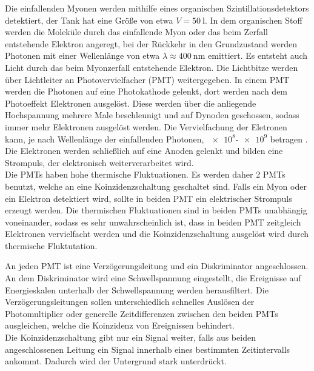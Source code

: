 \noindent Die einfallenden Myonen werden mithilfe eines organischen Szintillationsdetektors detektiert, der Tank hat eine Größe von etwa $V = \SI{50}{\litre}$. 
In dem organischen Stoff werden die Moleküle durch das einfallende Myon oder das beim Zerfall entstehende Elektron angeregt, 
bei der Rückkehr in den Grundzustand werden Photonen mit einer Wellenlänge von etwa $\lambda \approx \SI{400}{\nano\metre}$ \cite{kalonoski} emittiert. Es entsteht 
auch Licht durch das beim Myonzerfall entstehende Elektron. Die Lichtbitze werden über Lichtleiter an Photovervielfacher (PMT) weitergegeben. In einem PMT werden die Photonen auf eine 
Photokathode gelenkt, dort werden nach dem Photoeffekt Elektronen ausgelöst. Diese werden über die anliegende Hochspannung mehrere Male beschleunigt und auf Dynoden geschossen, sodass 
immer mehr Elektronen ausgelöst werden. Die Vervielfachung der Eletronen kann, je nach Wellenlänge der einfallenden Photonen, $\num{e8}$-$\num{e9}$ betragen \cite{kalonoski}.
Die Elektronen werden schließlich auf eine Anoden gelenkt und bilden eine Strompuls, der elektronisch weiterverarbeitet wird. \\
Die PMTs haben hohe thermische Fluktuationen. Es werden daher 2 PMTs benutzt, welche an eine Koinzidenzschaltung geschaltet sind. Falls ein Myon oder ein Elektron detektiert wird, sollte 
in beiden PMT ein elektrischer Strompuls erzeugt werden. Die thermischen Fluktuationen sind in beiden PMTs unabhängig voneinander, sodass es sehr unwahrscheinlich ist, dass in beiden PMT 
zeitgleich Elektronen vervielfacht werden und die Koinzidenzschaltung ausgelöst wird durch thermische Fluktutation. 

\noindent An jeden PMT ist eine Verzögerungsleitung und ein Diskriminator angeschlossen. An dem Diskriminator wird eine Schwellspannung eingestellt, die Ereignisse auf Energieskalen unterhalb 
der Schwellspannung werden herausfiltert. Die Verzögerungsleitungen sollen unterschiedlich schnelles Auslösen der Photomultiplier oder generelle Zeitdifferenzen zwischen den beiden PMTs 
ausgleichen, welche die Koinzidenz von Ereignissen behindert.\\
Die Koinzidenzschaltung gibt nur ein Signal weiter, falls aus beiden angeschlossenen Leitung ein Signal innerhalb eines bestimmten Zeitintervalls ankommt. Dadurch wird der Untergrund 
stark unterdrückt.\\

